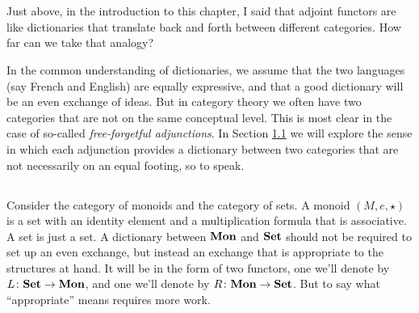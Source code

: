 \documentclass[CT4S-EN-RU]{subfiles}
\begin{document}
\section{}

\begin{blockENG}
Just above, in the introduction to this chapter, I said that adjoint functors are like dictionaries that translate back and forth between different categories. How far can we take that analogy?
\end{blockENG}

\begin{blockRUS}
\end{blockRUS}

\begin{blockENG}
In the common understanding of dictionaries, we assume that the two languages (say French and English) are equally expressive, and that a good dictionary will be an even exchange of ideas. But in category theory we often have two categories that are not on the same conceptual level. This is most clear in the case of so-called {\em free-forgetful adjunctions}. In Section \ref{sec:adjoints discuss and define} we will explore the sense in which each adjunction provides a dictionary between two categories that are not necessarily on an equal footing, so to speak.
\end{blockENG}

\begin{blockRUS}
\end{blockRUS}


\subsection{}\label{sec:adjoints discuss and define}

\begin{blockENG}
Consider the category of monoids and the category of sets. A monoid $(M,e,\star)$ is a set with an identity element and a multiplication formula that is associative. A set is just a set. A dictionary between ${\mathbf{Mon}}$ and ${\mathbf{Set}}$ should not be required to set up an even exchange, but instead an exchange that is appropriate to the structures at hand. It will be in the form of two functors, one we'll denote by $L\colon{\mathbf{Set}}\rightarrow{\mathbf{Mon}}$, and one we'll denote by $R\colon{\mathbf{Mon}}\rightarrow{\mathbf{Set}}$. But to say what “appropriate” means requires more work.
\end{blockENG}
\end{document}
